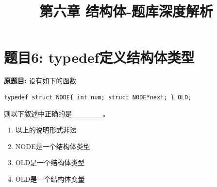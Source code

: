 \documentclass[a4paper,12pt]{article}
\title{\textbf{第六章 结构体-题库深度解析}}
\author{}
\date{}
\begin{document}
\maketitle

\tableofcontents
\newpage

\section*{题目6: typedef定义结构体类型}

\textbf{原题目:}
设有如下的函数
\begin{verbatim}
typedef struct NODE{ int num; struct NODE*next; } OLD;
\end{verbatim}
则以下叙述中正确的是\_\_\_\_\_\_。
\begin{enumerate}
	\item[A)] 以上的说明形式非法
	\item[B)] NODE是一个结构体类型
	\item[C)] OLD是一个结构体类型
	\item[D)] OLD是一个结构体变量
\end{enumerate}
\end{document}
